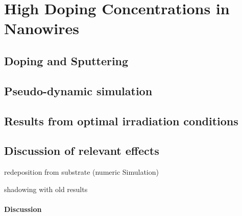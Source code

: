 \chapter{High Doping Concentrations in Nanowires}

\section{Doping and Sputtering}

\section{Pseudo-dynamic simulation}

\section{Results from optimal irradiation conditions}

\section{Discussion of relevant effects}

redeposition from substrate (numeric Simulation)

shadowing with old results

\subsubsection{Discussion}